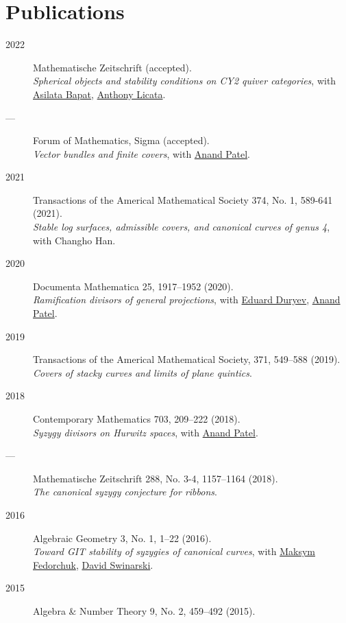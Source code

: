 \documentclass[11pt]{article}
\begin{document}
\section*{Publications}
\label{sec:org49e4adf}
\begin{description}
\item[{2022}] Mathematische Zeitschrift (accepted).\\[0pt]
\emph{Spherical objects and stability conditions on CY2 quiver categories}, with \href{https://asilata.github.io/}{Asilata Bapat}, \href{https://maths-people.anu.edu.au/\~licatat/}{Anthony Licata}.
\item[{---}] Forum of Mathematics, Sigma (accepted).\\[0pt]
\emph{Vector bundles and finite covers}, with \href{https://sites.google.com/view/anand-patel}{Anand Patel}.
\item[{2021}] Transactions of the Americal Mathematical Society 374, No. 1, 589-641 (2021).\\[0pt]
\emph{Stable log surfaces, admissible covers, and canonical curves of genus 4}, with Changho Han.
\item[{2020}] Documenta Mathematica 25, 1917--1952 (2020).\\[0pt]
\emph{Ramification divisors of general projections}, with \href{https://eduryev.weebly.com/}{Eduard Duryev}, \href{https://sites.google.com/view/anand-patel}{Anand Patel}.
\item[{2019}] Transactions of the Americal Mathematical Society, 371, 549--588 (2019).\\[0pt]
\emph{Covers of stacky curves and limits of plane quintics}.
\item[{2018}] Contemporary Mathematics 703, 209--222 (2018).\\[0pt]
\emph{Syzygy divisors on Hurwitz spaces}, with \href{https://sites.google.com/view/anand-patel}{Anand Patel}.
\item[{---}] Mathematische Zeitschrift 288, No. 3-4, 1157--1164 (2018).\\[0pt]
\emph{The canonical syzygy conjecture for ribbons}.
\item[{2016}] Algebraic Geometry 3, No. 1, 1--22 (2016).\\[0pt]
\emph{Toward GIT stability of syzygies of canonical curves}, with \href{https://www2.bc.edu/maksym-fedorchuk/}{Maksym Fedorchuk}, \href{http://faculty.fordham.edu/dswinarski/}{David Swinarski}.
\item[{2015}] Algebra \& Number Theory 9, No. 2, 459--492 (2015).\\[0pt]

\end{description}
\end{document}
